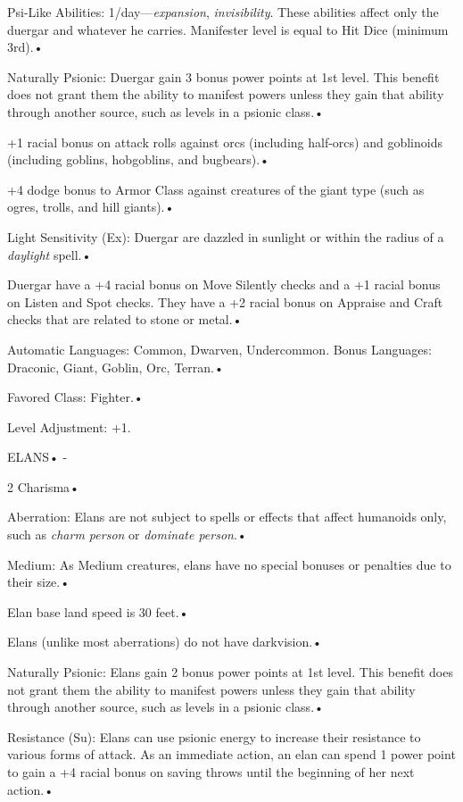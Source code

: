 \documentclass{article}
\begin{document}
\parindent=7pt
Psi-Like Abilities: 1/day---\textit{expansion}, \textit{invisibility}. These abilities 
affect only the duergar and whatever he carries. Manifester level is equal to Hit 
Dice (minimum 3rd).• 

\parindent=3pt
Naturally Psionic: Duergar gain 3 bonus power points at 1st level. This benefit 
does not grant them the ability to manifest powers unless they gain that ability 
through another source, such as levels in a psionic class.• 

+1 racial bonus on attack rolls against orcs (including half-orcs) and goblinoids 
(including goblins, hobgoblins, and bugbears).• 

\parindent=7pt
+4 dodge bonus to Armor Class against creatures of the giant type (such as ogres, 
trolls, and hill giants).• 

\parindent=3pt
Light Sensitivity (Ex): Duergar are dazzled in sunlight or within the radius of 
a \textit{daylight }spell.• 

Duergar have a +4 racial bonus on Move Silently checks and a +1 racial bonus on 
Listen and Spot checks. They have a +2 racial bonus on Appraise and Craft checks 
that are related to stone or metal.• 

\parindent=7pt
Automatic Languages: Common, Dwarven, Undercommon. Bonus Languages: Draconic, Giant, 
Goblin, Orc, Terran.• 

\parindent=3pt
Favored Class: Fighter.• 

Level Adjustment: +1.

\vspace{12pt}
\parindent=0pt
{\LARGE{}ELANS• -}

\parindent=3pt
2 Charisma• 

Aberration: Elans are not subject to spells or effects that affect humanoids only, 
such as \textit{charm person }or \textit{dominate person}.• 

Medium: As Medium creatures, elans have no special bonuses or penalties due to 
their size.• 

\parindent=7pt
Elan base land speed is 30 feet.• 

\parindent=3pt
Elans (unlike most aberrations) do not have darkvision.• 

Naturally Psionic: Elans gain 2 bonus power points at 1st level. This benefit does 
not grant them the ability to manifest powers unless they gain that ability through 
another source, such as levels in a psionic class.• 

\parindent=7pt
Resistance (Su): Elans can use psionic energy to increase their resistance to various 
forms of attack. As an immediate action, an elan can spend 1 power point to gain 
a +4 racial bonus on saving throws until the beginning of her next action.• 
\end{document}
